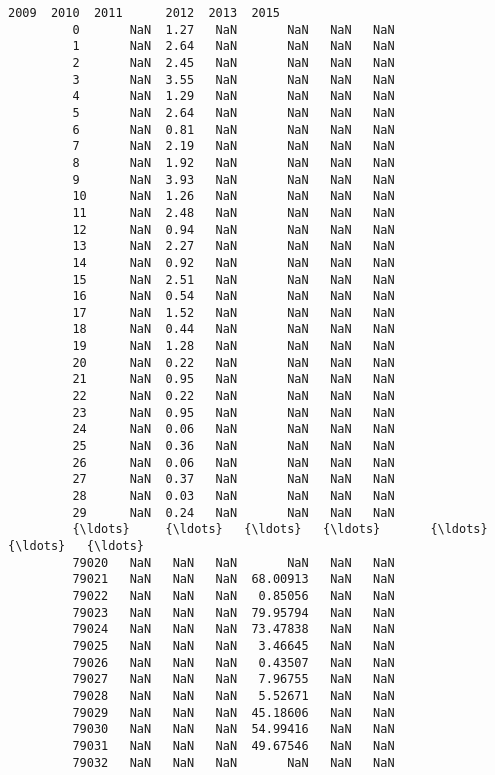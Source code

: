 \documentclass[11pt]{article}
\begin{document}
\begin{Verbatim}[commandchars=\\\{\}]
                2009  2010  2011      2012  2013  2015  
         0       NaN  1.27   NaN       NaN   NaN   NaN  
         1       NaN  2.64   NaN       NaN   NaN   NaN  
         2       NaN  2.45   NaN       NaN   NaN   NaN  
         3       NaN  3.55   NaN       NaN   NaN   NaN  
         4       NaN  1.29   NaN       NaN   NaN   NaN  
         5       NaN  2.64   NaN       NaN   NaN   NaN  
         6       NaN  0.81   NaN       NaN   NaN   NaN  
         7       NaN  2.19   NaN       NaN   NaN   NaN  
         8       NaN  1.92   NaN       NaN   NaN   NaN  
         9       NaN  3.93   NaN       NaN   NaN   NaN  
         10      NaN  1.26   NaN       NaN   NaN   NaN  
         11      NaN  2.48   NaN       NaN   NaN   NaN  
         12      NaN  0.94   NaN       NaN   NaN   NaN  
         13      NaN  2.27   NaN       NaN   NaN   NaN  
         14      NaN  0.92   NaN       NaN   NaN   NaN  
         15      NaN  2.51   NaN       NaN   NaN   NaN  
         16      NaN  0.54   NaN       NaN   NaN   NaN  
         17      NaN  1.52   NaN       NaN   NaN   NaN  
         18      NaN  0.44   NaN       NaN   NaN   NaN  
         19      NaN  1.28   NaN       NaN   NaN   NaN  
         20      NaN  0.22   NaN       NaN   NaN   NaN  
         21      NaN  0.95   NaN       NaN   NaN   NaN  
         22      NaN  0.22   NaN       NaN   NaN   NaN  
         23      NaN  0.95   NaN       NaN   NaN   NaN  
         24      NaN  0.06   NaN       NaN   NaN   NaN  
         25      NaN  0.36   NaN       NaN   NaN   NaN  
         26      NaN  0.06   NaN       NaN   NaN   NaN  
         27      NaN  0.37   NaN       NaN   NaN   NaN  
         28      NaN  0.03   NaN       NaN   NaN   NaN  
         29      NaN  0.24   NaN       NaN   NaN   NaN  
         {\ldots}     {\ldots}   {\ldots}   {\ldots}       {\ldots}   {\ldots}   {\ldots}  
         79020   NaN   NaN   NaN       NaN   NaN   NaN  
         79021   NaN   NaN   NaN  68.00913   NaN   NaN  
         79022   NaN   NaN   NaN   0.85056   NaN   NaN  
         79023   NaN   NaN   NaN  79.95794   NaN   NaN  
         79024   NaN   NaN   NaN  73.47838   NaN   NaN  
         79025   NaN   NaN   NaN   3.46645   NaN   NaN  
         79026   NaN   NaN   NaN   0.43507   NaN   NaN  
         79027   NaN   NaN   NaN   7.96755   NaN   NaN  
         79028   NaN   NaN   NaN   5.52671   NaN   NaN  
         79029   NaN   NaN   NaN  45.18606   NaN   NaN  
         79030   NaN   NaN   NaN  54.99416   NaN   NaN  
         79031   NaN   NaN   NaN  49.67546   NaN   NaN  
         79032   NaN   NaN   NaN       NaN   NaN   NaN  

\end{Verbatim}
\end{document}
